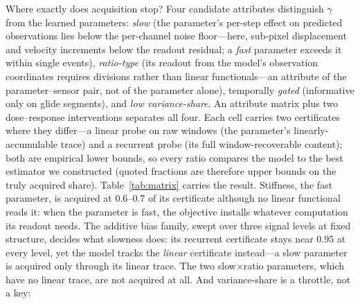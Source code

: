 \documentclass{article} %
\begin{document}
Where exactly does acquisition stop? Four candidate attributes distinguish
$\gamma$ from the learned parameters: \emph{slow} (the parameter's per-step
effect on predicted observations lies below the per-channel noise
floor---here, sub-pixel displacement and velocity increments below the
readout residual; a \emph{fast} parameter exceeds it within single events),
\emph{ratio-type} (its readout from the
model's observation coordinates requires divisions rather than linear
functionals---an attribute of the parameter--sensor pair, not of the
parameter alone), temporally \emph{gated} (informative only on glide
segments), and \emph{low variance-share}. An attribute matrix plus two
dose--response interventions separates all four. Each cell carries two
certificates where they differ---a linear probe on raw windows (the
parameter's linearly-accumulable trace) and a recurrent probe (its full
window-recoverable content); both are empirical lower bounds, so every ratio
compares the model to the best estimator we constructed (quoted fractions
are therefore upper bounds on the truly acquired share).
Table~\ref{tab:matrix} carries the result. Stiffness, the fast parameter, is
acquired at $0.6$--$0.7$ of its certificate although no linear functional
reads it: when the parameter is fast, the objective installs whatever
computation its readout needs. The additive bias family, swept over three
signal levels at fixed structure, decides what slowness does: its recurrent
certificate stays near $0.95$ at every level, yet the model tracks the
\emph{linear} certificate instead---a slow parameter is acquired only
through its linear trace. The two slow$\times$ratio parameters, which have
no linear trace, are not acquired at all. And variance-share is a throttle,
not a key:
\end{document}
